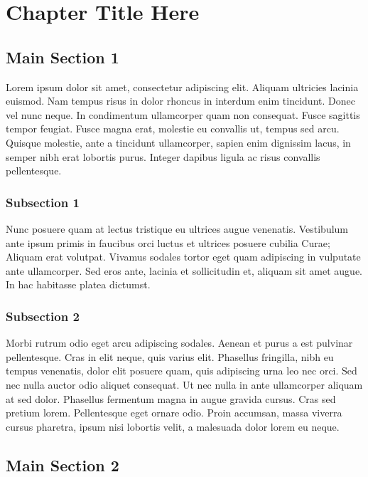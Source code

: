 \chapter{Chapter Title Here} \label{chap:example}

\section{Main Section 1}

Lorem ipsum dolor sit amet, consectetur adipiscing elit.
Aliquam ultricies lacinia euismod.
Nam tempus risus in dolor rhoncus in interdum enim tincidunt.
Donec vel nunc neque.
In condimentum ullamcorper quam non consequat.
Fusce sagittis tempor feugiat.
Fusce magna erat, molestie eu convallis ut, tempus sed arcu.
Quisque molestie, ante a tincidunt ullamcorper, sapien enim dignissim lacus, in semper nibh erat lobortis purus.
Integer dapibus ligula ac risus convallis pellentesque.

\subsection{Subsection 1}

Nunc posuere quam at lectus tristique eu ultrices augue venenatis.
Vestibulum ante ipsum primis in faucibus orci luctus et ultrices posuere cubilia Curae;
Aliquam erat volutpat.
Vivamus sodales tortor eget quam adipiscing in vulputate ante ullamcorper.
Sed eros ante, lacinia et sollicitudin et, aliquam sit amet augue.
In hac habitasse platea dictumst.

\subsection{Subsection 2}
Morbi rutrum odio eget arcu adipiscing sodales.
Aenean et purus a est pulvinar pellentesque.
Cras in elit neque, quis varius elit.
Phasellus fringilla, nibh eu tempus venenatis, dolor elit posuere quam, quis adipiscing urna leo nec orci.
Sed nec nulla auctor odio aliquet consequat.
Ut nec nulla in ante ullamcorper aliquam at sed dolor.
Phasellus fermentum magna in augue gravida cursus.
Cras sed pretium lorem.
Pellentesque eget ornare odio.
Proin accumsan, massa viverra cursus pharetra, ipsum nisi lobortis velit, a malesuada dolor lorem eu neque.

\section{Main Section 2}

